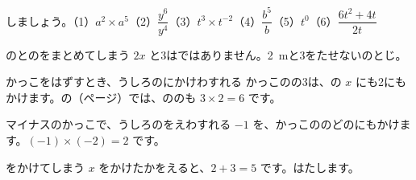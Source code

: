 \begin{jibun}
しましょう。\quad（1）\nobreak $a^2\times a^5$\quad（2）\nobreak $\dfrac{y^6}{y^4}$\quad（3）\nobreak $t^3\times t^{-2}$\quad（4）\nobreak $\dfrac{b^5}{b}$\quad（5）\nobreak $t^0$\quad（6）\nobreak $\dfrac{6t^2+4t}{2t}$
\end{jibun}



\begin{tsumazuki}{のとのをまとめてしまう}
$2x$ と3はではありません。\qty{2}{m}と3をたせないのとじ。
\end{tsumazuki}

\begin{tsumazuki}{かっこをはずすとき、うしろのにかけわすれる}
かっこのの3は、の $x$ にも2にもかけます。の（\pageref{bk:2-12:kakko}ページ）では、ののも $3\times2=6$ です。
\end{tsumazuki}

\begin{tsumazuki}{マイナスのかっこで、うしろのをえわすれる}
$-1$ を、かっこののどのにもかけます。$(-1)\times(-2)=2$ です。
\end{tsumazuki}

\begin{tsumazuki}{をかけてしまう}
$x$ をかけたかをえると、$2+3=5$ です。はたします。
\end{tsumazuki}


